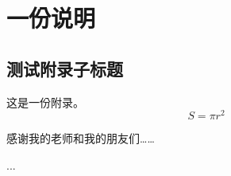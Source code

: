 \documentclass[degree=master, academic=true, blindreview=false]{nwputhesis}
\begin{document}
\cleardoublepage




\appendix
\chapter{一份说明}

\section{测试附录子标题}

这是一份附录。
\begin{equation}
    S = \pi r^2
\end{equation}

\cleardoublepage

\backmatter

\begin{acknowledgements}
    感谢我的老师和我的朋友们……
\end{acknowledgements}

\begin{accomplishments}
    [1] ...
\end{accomplishments}

\makestatement                                                  %
\end{document}

